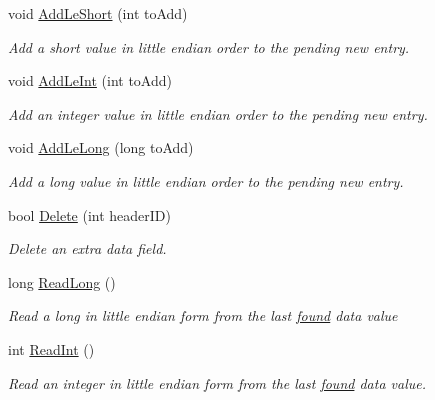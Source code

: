 \begin{DoxyCompactItemize}
void \hyperlink{class_i_c_sharp_code_1_1_sharp_zip_lib_1_1_zip_1_1_zip_extra_data_acc356859af6fe44b71ca605473385dec}{Add\+Le\+Short} (int to\+Add)
\begin{DoxyCompactList}\small\item\em Add a short value in little endian order to the pending new entry. \end{DoxyCompactList}\item 
void \hyperlink{class_i_c_sharp_code_1_1_sharp_zip_lib_1_1_zip_1_1_zip_extra_data_ac688733a0684d0e2a32da357d444212a}{Add\+Le\+Int} (int to\+Add)
\begin{DoxyCompactList}\small\item\em Add an integer value in little endian order to the pending new entry. \end{DoxyCompactList}\item 
void \hyperlink{class_i_c_sharp_code_1_1_sharp_zip_lib_1_1_zip_1_1_zip_extra_data_aafc11e296c9769e11ddfbc07dee754e7}{Add\+Le\+Long} (long to\+Add)
\begin{DoxyCompactList}\small\item\em Add a long value in little endian order to the pending new entry. \end{DoxyCompactList}\item 
bool \hyperlink{class_i_c_sharp_code_1_1_sharp_zip_lib_1_1_zip_1_1_zip_extra_data_a6726b4cecc913a3a09cea0b97e2edf7b}{Delete} (int header\+ID)
\begin{DoxyCompactList}\small\item\em Delete an extra data field. \end{DoxyCompactList}\item 
long \hyperlink{class_i_c_sharp_code_1_1_sharp_zip_lib_1_1_zip_1_1_zip_extra_data_a06f9836c2c567c9f223810d3e2d9b51c}{Read\+Long} ()
\begin{DoxyCompactList}\small\item\em Read a long in little endian form from the last \hyperlink{class_i_c_sharp_code_1_1_sharp_zip_lib_1_1_zip_1_1_zip_extra_data_a91e0c6c1d11967653256ccb161f9818c}{found} data value \end{DoxyCompactList}\item 
int \hyperlink{class_i_c_sharp_code_1_1_sharp_zip_lib_1_1_zip_1_1_zip_extra_data_a77039b5fe5d0c56be598b5eadb669a62}{Read\+Int} ()
\begin{DoxyCompactList}\small\item\em Read an integer in little endian form from the last \hyperlink{class_i_c_sharp_code_1_1_sharp_zip_lib_1_1_zip_1_1_zip_extra_data_a91e0c6c1d11967653256ccb161f9818c}{found} data value. \end{DoxyCompactList}\item 

\end{DoxyCompactItemize}
